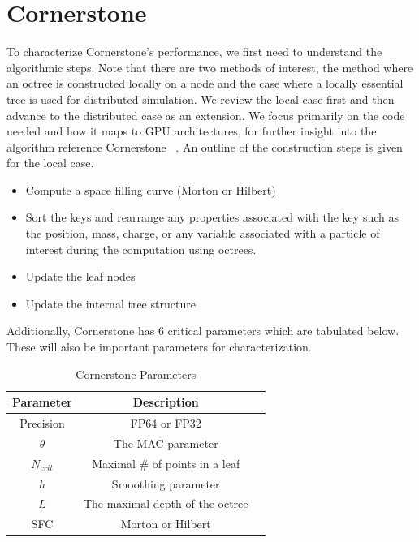 \section{Cornerstone}
\label{sec:cornerstone}

To characterize Cornerstone's performance, we first need to understand the algorithmic steps. Note that there are two methods of interest, the method where an octree is constructed locally on a node and the case where a locally essential tree is used for distributed simulation. We review the local case first and then advance to the distributed case as an extension. We focus primarily on the code needed and how it maps to GPU architectures, for further insight into the algorithm reference Cornerstone ~\cite{cornerstone}. An outline of the construction steps is given for the local case.
\begin{itemize}
    \item Compute a space filling curve (Morton or Hilbert)
    \item Sort the keys and rearrange any properties associated with the key such as the position, mass, charge, or any variable associated with a particle of interest during the computation using octrees.
    \item Update the leaf nodes
    \item Update the internal tree structure
\end{itemize}

Additionally, Cornerstone has 6 critical parameters which are tabulated below. These will also be important parameters for characterization.

\begin{table}[h!]
    \centering
    \caption{Cornerstone Parameters}
    \label{tab:my_table}
    \begin{tabular}{|c|c|c|}
        \hline
        \textbf{Parameter} & \textbf{Description} \\
        \hline
        Precision & FP64 or FP32 \\
        $\theta$ & The MAC parameter \\
        $N_{crit}$ & Maximal \# of points in a leaf \\ 
        $h$ & Smoothing parameter \\
        $L$ & The maximal depth of the octree \\
        SFC & Morton or Hilbert \\
        \hline
    \end{tabular}
\end{table}

